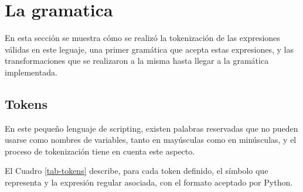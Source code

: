 \section{La gramatica}

En esta sección se muestra cómo se realizó la tokenización de las expresiones válidas en este leguaje, una primer gramática que acepta estas expresiones, y las transformaciones que se realizaron a la misma hasta llegar a la gramática implementada.

\subsection{Tokens}

En este pequeño lenguaje de scripting, existen palabras reservadas que no pueden usarse como nombres de variables, tanto en mayúsculas como en minúsculas, y el proceso de tokenización tiene en cuenta este aspecto.

El Cuadro \ref{tab-tokens} describe, para cada token definido, el símbolo que representa y la expresión regular asociada, con el formato aceptado por Python.

